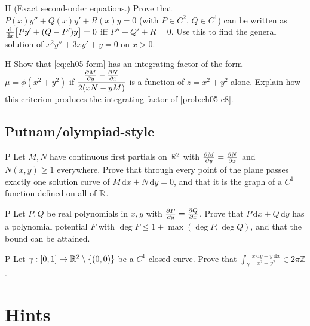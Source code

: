 \begin{problem}{H}\label{prob:ch05-h4}
(Exact second-order equations.)  Prove that
$P(x)y'' + Q(x)y' + R(x)y = 0$ (with $P\in C^2$, $Q\in C^1$) can be written as
$\frac{\mathrm{d}}{\mathrm{d}x}\bigl[P y' + (Q - P')y\bigr] = 0$ iff $P'' - Q' + R = 0$. Use this
to find the general solution of $x^2y'' + 3xy' + y = 0$ on $x>0$.
\end{problem}

\begin{problem}{H}\label{prob:ch05-h5}
Show that \eqref{eq:ch05-form} has an integrating factor of the form
$\mu = \phi(x^2 + y^2)$ if
$\dfrac{\frac{\partial M}{\partial y} - \frac{\partial N}{\partial x}}{2(xN - yM)}$ is a function of $z = x^2 + y^2$
alone. Explain how this criterion produces the integrating factor of
\cref{prob:ch05-c8}.
\end{problem}

\subsection*{Putnam/olympiad-style}

\begin{problem}{P}\label{prob:ch05-p1}
Let $M, N$ have continuous first partials on $\mathbb{R}^2$ with
$\frac{\partial M}{\partial y} = \frac{\partial N}{\partial x}$ and $N(x,y)\ge 1$ everywhere. Prove that through
every point of the plane passes exactly one solution curve of
$M\,\mathrm{d}x + N\,\mathrm{d}y = 0$, and that it is the graph of a $C^1$
function defined on all of $\mathbb{R}$.
\end{problem}

\begin{problem}{P}\label{prob:ch05-p2}
Let $P, Q$ be real polynomials in $x,y$ with $\frac{\partial P}{\partial y} = \frac{\partial Q}{\partial x}$. Prove
that $P\,\mathrm{d}x + Q\,\mathrm{d}y$ has a polynomial potential $F$ with
$\deg F\le 1 + \max(\deg P,\deg Q)$, and that the bound can be attained.
\end{problem}

\begin{problem}{P}\label{prob:ch05-p3}
Let $\gamma:[0,1]\to\mathbb{R}^2\setminus\{(0,0)\}$ be a $C^1$ closed curve. Prove that
$\displaystyle\int_\gamma\frac{x\,\mathrm{d}y - y\,\mathrm{d}x}{x^2+y^2}\in 2\pi\mathbb{Z}$.
\end{problem}

\section{Hints}\label{sec:ch05-hints}

